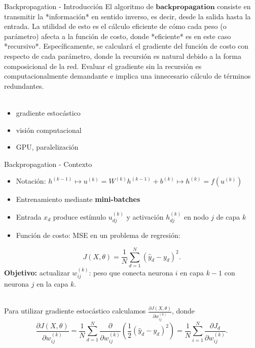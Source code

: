 \documentclass[handout, 9pt]{beamer}
\begin{document}
\begin{frame}{Backpropagation - Introducción}
El algoritmo de $\textbf{backpropagation}$ consiste en transmitir la *información* en sentido inverso, es decir, desde la salida hasta la entrada. La utilidad de esto es el cálculo eficiente de cómo cada peso (o parámetro) afecta a la función de costo, donde *eficiente* es en este caso *recursivo*. Específicamente, se calculará el gradiente del función de costo con respecto de cada parámetro, donde la recursión es natural debido a la forma composicional de la red. Evaluar el gradiente sin la recursión es computacionalmente demandante e implica una innecesario cálculo de términos redundantes.\\~\


\begin{itemize}
\item gradiente estocástico
\item visión computacional
\item GPU, paralelización
\end{itemize}




\end{frame}

\begin{frame}{Backpropagation - Contexto}

\begin{itemize}
  \item Notación: $h^{(k-1)} \mapsto u^{(k)} = W^{(k)} h^{(k-1)}  + b^{(k)} \mapsto h^{(k)} = f(u^{(k)})$ \pause

  \item Entrenamiento mediante \textbf{mini-batches}
  \item Entrada $x_d$ produce estímulo $u_{dj}^{(k)}$  y activación $h_{dj}^{(k)}$  en nodo $j$ de capa $k$ \pause
 
 \item Función de costo: MSE en un problema de regresión:  \pause

\end{itemize} 
\[
J(X , \theta) = \frac{1}{N}\sum_{d=1}^N(\hat{y}_d-y_d)^2.
\]
\textbf{Objetivo:} actualizar $w_{ij}^{(k)}$: peso que conecta neurona $i$ en capa $k-1$ con neurona $j$ en la capa $k$. \\~\

Para utilizar gradiente estocástico calculamos $\frac{\partial J(X , \theta) }{\partial w_{ij}^{(k)}}$, donde \pause
\[
\frac{\partial J(X , \theta) }{\partial w_{ij}^{(k)}} = \frac{1}{N}\sum_{d=1}^N \frac{\partial}{\partial w_{ij}^{(k)}} \left ( \frac{1}{2}(\hat{y}_d-y_d)^2 \right) = \frac{1}{N}\sum_{i=1}^N \frac{\partial J_d}{\partial w_{ij}^{(k)}}.
\]
\end{frame}
\end{document}
